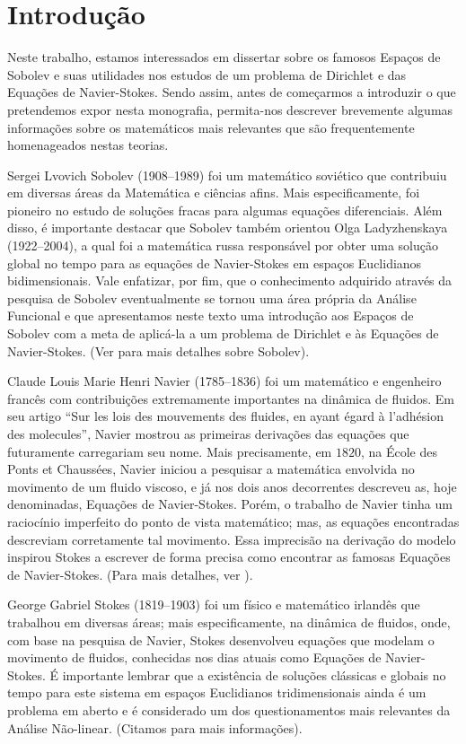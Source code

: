 \chapter*{Introdução}

Neste trabalho, estamos interessados em dissertar sobre os famosos Espaços de Sobolev e suas utilidades nos estudos de um problema de Dirichlet e das Equações de Navier-Stokes. Sendo assim, antes de começarmos a introduzir o que
pretendemos expor nesta monografia, permita-nos descrever brevemente algumas informações sobre os matemáticos mais relevantes que são frequentemente homenageados nestas teorias.

Sergei Lvovich Sobolev (1908--1989) foi um matemático soviético que contribuiu em diversas áreas da Matemática e ciências afins. Mais especificamente, foi pioneiro no estudo de soluções fracas para algumas equações diferenciais. Além disso, é importante destacar que  Sobolev também orientou Olga Ladyzhenskaya (1922--2004),  a qual foi a matemática russa responsável por obter uma solução global no tempo para as equações de Navier-Stokes em espaços Euclidianos bidimensionais. Vale enfatizar, por fim, que o conhecimento adquirido através da pesquisa de Sobolev eventualmente se tornou uma área própria da Análise Funcional e que apresentamos neste texto uma introdução aos Espaços de Sobolev com a meta de aplicá-la a um problema de Dirichlet e às Equações de Navier-Stokes. (Ver \cite{sobolev} para mais detalhes sobre Sobolev).

Claude Louis Marie Henri Navier (1785--1836) foi um matemático e engenheiro francês com contribuições extremamente importantes na dinâmica de fluidos. Em seu artigo ``Sur les lois des mouvements des fluides, en ayant égard à l’adhésion des molecules'', Navier mostrou as primeiras derivações das equações que futuramente carregariam seu nome. Mais precisamente, em $1820$, na École des Ponts et Chaussées, Navier iniciou a pesquisar a matemática envolvida no movimento de um fluido viscoso, e já nos dois anos decorrentes descreveu as, hoje denominadas, Equações de Navier-Stokes. Porém, o trabalho de Navier tinha um raciocínio imperfeito do ponto de vista matemático; mas, as equações encontradas descreviam corretamente tal movimento. Essa imprecisão na derivação do modelo inspirou Stokes a escrever de forma precisa como encontrar as famosas Equações de Navier-Stokes. (Para mais detalhes, ver \cite{navier}).

George Gabriel Stokes (1819--1903) foi um físico e matemático irlandês que trabalhou em diversas áreas; mais  especificamente, na dinâmica de fluidos, onde, com base na pesquisa de Navier, Stokes desenvolveu equações que modelam o movimento de fluidos, conhecidas nos dias atuais como Equações de Navier-Stokes. É importante lembrar que a existência de  soluções clássicas e globais no tempo para este sistema em espaços Euclidianos tridimensionais ainda é um problema em aberto e é considerado um dos questionamentos mais relevantes da Análise Não-linear. (Citamos \cite{stokes} para mais informações).

